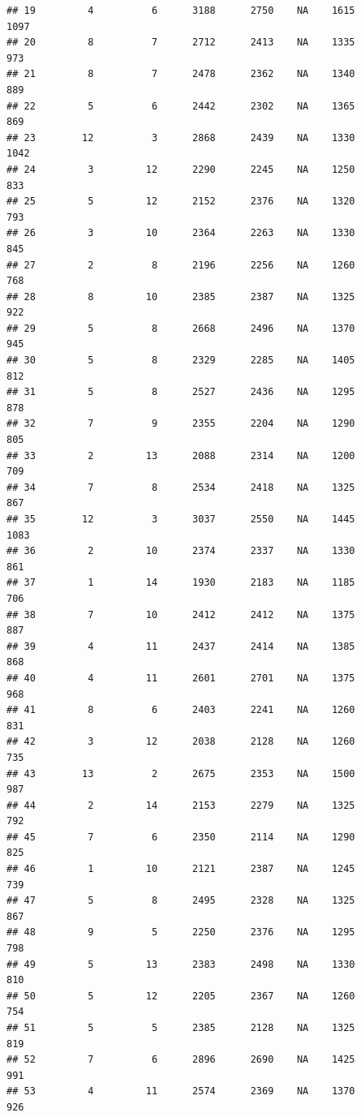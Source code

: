 \documentclass[]{book}
\begin{document}
\begin{verbatim}
## 19         4          6      3188      2750    NA    1615           1097
## 20         8          7      2712      2413    NA    1335            973
## 21         8          7      2478      2362    NA    1340            889
## 22         5          6      2442      2302    NA    1365            869
## 23        12          3      2868      2439    NA    1330           1042
## 24         3         12      2290      2245    NA    1250            833
## 25         5         12      2152      2376    NA    1320            793
## 26         3         10      2364      2263    NA    1330            845
## 27         2          8      2196      2256    NA    1260            768
## 28         8         10      2385      2387    NA    1325            922
## 29         5          8      2668      2496    NA    1370            945
## 30         5          8      2329      2285    NA    1405            812
## 31         5          8      2527      2436    NA    1295            878
## 32         7          9      2355      2204    NA    1290            805
## 33         2         13      2088      2314    NA    1200            709
## 34         7          8      2534      2418    NA    1325            867
## 35        12          3      3037      2550    NA    1445           1083
## 36         2         10      2374      2337    NA    1330            861
## 37         1         14      1930      2183    NA    1185            706
## 38         7         10      2412      2412    NA    1375            887
## 39         4         11      2437      2414    NA    1385            868
## 40         4         11      2601      2701    NA    1375            968
## 41         8          6      2403      2241    NA    1260            831
## 42         3         12      2038      2128    NA    1260            735
## 43        13          2      2675      2353    NA    1500            987
## 44         2         14      2153      2279    NA    1325            792
## 45         7          6      2350      2114    NA    1290            825
## 46         1         10      2121      2387    NA    1245            739
## 47         5          8      2495      2328    NA    1325            867
## 48         9          5      2250      2376    NA    1295            798
## 49         5         13      2383      2498    NA    1330            810
## 50         5         12      2205      2367    NA    1260            754
## 51         5          5      2385      2128    NA    1325            819
## 52         7          6      2896      2690    NA    1425            991
## 53         4         11      2574      2369    NA    1370            926

\end{verbatim}
\end{document}
